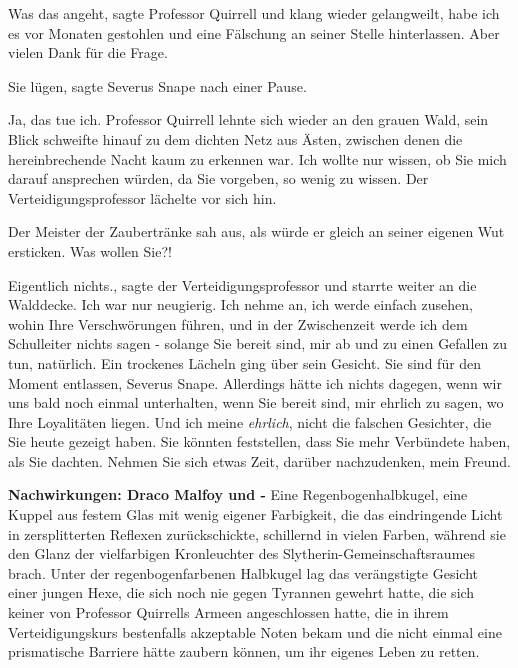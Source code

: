 \glqq Was das angeht\grqq{}, sagte Professor Quirrell und klang wieder
gelangweilt, \glqq habe ich es vor Monaten gestohlen und eine Fälschung an
seiner Stelle hinterlassen. Aber vielen Dank für die Frage.\grqq{}

\glqq Sie lügen\grqq{}, sagte Severus Snape nach einer Pause.

\glqq Ja, das tue ich.\grqq{} Professor Quirrell lehnte sich wieder an den
grauen Wald, sein Blick schweifte hinauf zu dem dichten Netz aus Ästen, zwischen
denen die hereinbrechende Nacht kaum zu erkennen war. \glqq Ich wollte nur
wissen, ob Sie mich darauf ansprechen würden, da Sie vorgeben, so wenig zu
wissen.\grqq{} Der Verteidigungsprofessor lächelte vor sich hin.

Der Meister der Zaubertränke sah aus, als würde er gleich an seiner eigenen Wut
ersticken. \glqq Was wollen Sie?!\grqq{}

\glqq Eigentlich nichts.\grqq{}, sagte der Verteidigungsprofessor und starrte
weiter an die Walddecke. \glqq Ich war nur neugierig. Ich nehme an, ich werde
einfach zusehen, wohin Ihre Verschwörungen führen, und in der Zwischenzeit werde
ich dem Schulleiter nichts sagen - solange Sie bereit sind, mir ab und zu einen
Gefallen zu tun, natürlich.\grqq{} Ein trockenes Lächeln ging über sein Gesicht.
\glqq Sie sind für den Moment entlassen, Severus Snape. Allerdings hätte ich
nichts dagegen, wenn wir uns bald noch einmal unterhalten, wenn Sie bereit sind,
mir ehrlich zu sagen, wo Ihre Loyalitäten liegen. Und ich meine \emph{ehrlich},
nicht die falschen Gesichter, die Sie heute gezeigt haben. Sie könnten
feststellen, dass Sie mehr Verbündete haben, als Sie dachten. Nehmen Sie sich
etwas Zeit, darüber nachzudenken, mein Freund.\grqq{}


\textbf{Nachwirkungen: Draco Malfoy und - }
Eine Regenbogenhalbkugel, eine Kuppel aus festem Glas mit wenig eigener
Farbigkeit, die das eindringende Licht in zersplitterten Reflexen
zurückschickte, schillernd in vielen Farben, während sie den Glanz der
vielfarbigen Kronleuchter des Slytherin-Gemeinschaftsraumes brach. Unter der
regenbogenfarbenen Halbkugel lag das verängstigte Gesicht einer jungen Hexe, die
sich noch nie gegen Tyrannen gewehrt hatte, die sich keiner von Professor
Quirrells Armeen angeschlossen hatte, die in ihrem Verteidigungskurs bestenfalls
akzeptable Noten bekam und die nicht einmal eine prismatische Barriere hätte
zaubern können, um ihr eigenes Leben zu retten.

